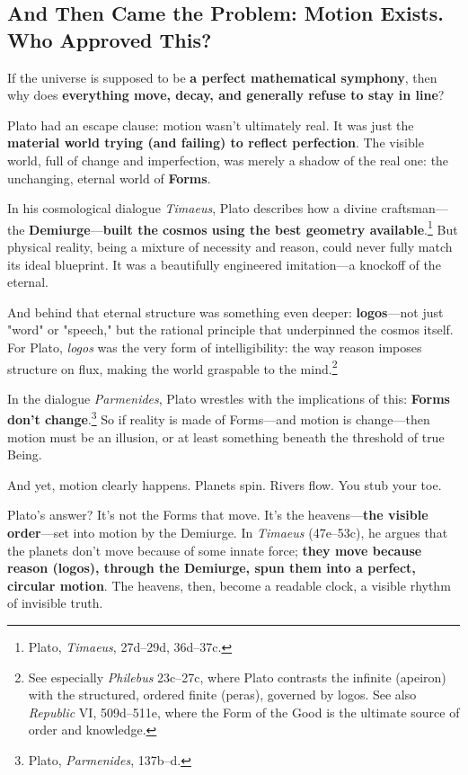 \subsection{And Then Came the Problem: Motion Exists. Who Approved This?}

If the universe is supposed to be \textbf{a perfect mathematical symphony}, then why does \textbf{everything move, decay, and generally refuse to stay in line}?

Plato had an escape clause: motion wasn’t ultimately real. It was just the \textbf{material world trying (and failing) to reflect perfection}. The visible world, full of change and imperfection, was merely a shadow of the real one: the unchanging, eternal world of \textbf{Forms}.

In his cosmological dialogue \textit{Timaeus}, Plato describes how a divine craftsman—the \textbf{Demiurge}—\textbf{built the cosmos using the best geometry available}.\footnote{Plato, \textit{Timaeus}, 27d–29d, 36d–37c.} But physical reality, being a mixture of necessity and reason, could never fully match its ideal blueprint. It was a beautifully engineered imitation—a knockoff of the eternal.

And behind that eternal structure was something even deeper: \textbf{logos}—not just "word" or "speech," but the rational principle that underpinned the cosmos itself. For Plato, \textit{logos} was the very form of intelligibility: the way reason imposes structure on flux, making the world graspable to the mind.\footnote{See especially \textit{Philebus} 23c–27c, where Plato contrasts the infinite (apeiron) with the structured, ordered finite (peras), governed by logos. See also \textit{Republic} VI, 509d–511e, where the Form of the Good is the ultimate source of order and knowledge.}

In the dialogue \textit{Parmenides}, Plato wrestles with the implications of this: \textbf{Forms don’t change}.\footnote{Plato, \textit{Parmenides}, 137b–d.} So if reality is made of Forms—and motion is change—then motion must be an illusion, or at least something beneath the threshold of true Being.

And yet, motion clearly happens. Planets spin. Rivers flow. You stub your toe.

Plato’s answer? It’s not the Forms that move. It’s the heavens—\textbf{the visible order}—set into motion by the Demiurge. In \textit{Timaeus} (47e–53c), he argues that the planets don’t move because of some innate force; \textbf{they move because reason (logos), through the Demiurge, spun them into a perfect, circular motion}. The heavens, then, become a readable clock, a visible rhythm of invisible truth.

